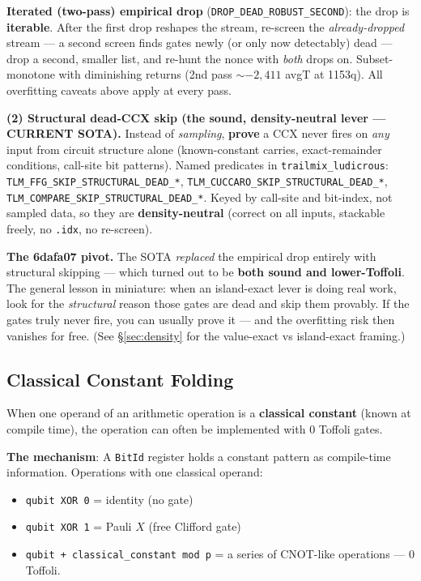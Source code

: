 \documentclass[11pt,a4paper]{article}
\begin{document}
\textbf{Iterated (two-pass) empirical drop} (\texttt{DROP\_DEAD\_ROBUST\_SECOND}): the drop is
\textbf{iterable}. After the first drop reshapes the stream, re-screen the \emph{already-dropped}
stream --- a second screen finds gates newly (or only now detectably) dead --- drop a second, smaller
list, and re-hunt the nonce with \emph{both} drops on. Subset-monotone with diminishing returns (2nd
pass $\sim$$-2{,}411$ avgT at 1153q). All overfitting caveats above apply at every pass.

\textbf{(2) Structural dead-CCX skip (the sound, density-neutral lever --- CURRENT SOTA).} Instead of
\emph{sampling}, \textbf{prove} a CCX never fires on \emph{any} input from circuit structure alone
(known-constant carries, exact-remainder conditions, call-site bit patterns). Named predicates in
\texttt{trailmix\_ludicrous}: \texttt{TLM\_FFG\_SKIP\_STRUCTURAL\_DEAD\_*},
\texttt{TLM\_CUCCARO\_SKIP\_STRUCTURAL\_DEAD\_*}, \texttt{TLM\_COMPARE\_SKIP\_STRUCTURAL\_DEAD\_*}.
Keyed by call-site and bit-index, not sampled data, so they are \textbf{density-neutral} (correct on
all inputs, stackable freely, no \texttt{.idx}, no re-screen).

\textbf{The 6dafa07 pivot.} The SOTA \emph{replaced} the empirical drop entirely with structural
skipping --- which turned out to be \textbf{both sound and lower-Toffoli}. The general lesson in
miniature: when an island-exact lever is doing real work, look for the \emph{structural} reason those
gates are dead and skip them provably. If the gates truly never fire, you can usually prove it --- and
the overfitting risk then vanishes for free. (See \S\ref{sec:density} for the value-exact vs
island-exact framing.)

\subsection{Classical Constant Folding}

When one operand of an arithmetic operation is a \textbf{classical constant} (known at compile
time), the operation can often be implemented with 0 Toffoli gates.

\textbf{The mechanism}: A \texttt{BitId} register holds a constant pattern as compile-time
information. Operations with one classical operand:
\begin{itemize}
  \item \texttt{qubit XOR 0} = identity (no gate)
  \item \texttt{qubit XOR 1} = Pauli $X$ (free Clifford gate)
  \item \texttt{qubit + classical\_constant mod p} = a series of CNOT-like operations --- 0 Toffoli.
\end{itemize}
\end{document}
